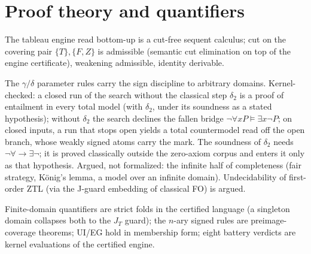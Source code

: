 \chapter{Proof theory and quantifiers}

\begin{theorem}\label{thm:cut}
  \leanok
  The tableau engine read bottom-up is a cut-free sequent calculus;
  cut on the covering pair $\{T\},\{F,Z\}$ is admissible (semantic cut
  elimination on top of the engine certificate), weakening admissible,
  identity derivable.
\end{theorem}

\begin{theorem}\label{thm:fo}
  \leanok
  The $\gamma/\delta$ parameter rules carry the sign discipline to
  arbitrary domains. Kernel-checked: a closed run of the search without the
  classical step $\delta_2$ is a proof of entailment in every total model
  (with $\delta_2$, under its soundness as a stated hypothesis); without
  $\delta_2$ the search declines the fallen bridge
  $\neg\forall x P \vDash \exists x\neg P$; on closed inputs, a run that stops
  open yields a total countermodel read off the open branch, whose
  weakly signed atoms carry the mark. The soundness of $\delta_2$ needs
  $\neg\forall\to\exists\neg$; it is proved classically outside the
  zero-axiom corpus and enters it only as that hypothesis. Argued, not
  formalized: the infinite half of completeness (fair strategy, K\"onig's
  lemma, a model over an infinite domain). Undecidability of first-order ZTL (via the J-guard embedding of classical
  FO) is argued.
\end{theorem}

\begin{theorem}\label{thm:quant}
  \leanok
  Finite-domain quantifiers are strict folds in the certified language
  (a singleton domain collapses both to the $J_T$ guard); the $n$-ary
  signed rules are preimage-coverage theorems; UI/EG hold in membership
  form; eight battery verdicts are kernel evaluations of the certified
  engine.
\end{theorem}

